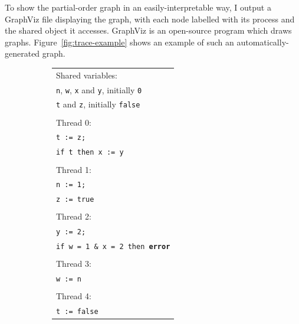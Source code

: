 \documentclass[12pt,a4paper,twoside,openany]{report}
\begin{document}
To show the partial-order graph in an
easily-interpretable way, I
output a GraphViz file displaying the
graph, with each node
labelled with its process and the
shared object it accesses.
GraphViz is an open-source program which
draws graphs.
Figure~\ref{fig:trace-example}
shows an example of such an
automatically-generated graph.

\begin{figure}
	\centering
	\begin{subfigure}{0.5\textwidth}
		\centering
		\begin{tabular}{l}
			Shared variables: \\
			\qquad \texttt{n}, \texttt{w},
			\texttt{x} and \texttt{y},
			initially \texttt{0} \\
			\qquad \texttt{t} and \texttt{z},
			initially \texttt{false} \\
			\\
			Thread 0: \\
			\qquad \texttt{t := z;} \\
			\qquad \texttt{if t then x := y} \\
			\\
			Thread 1: \\
			\qquad \texttt{n := 1;} \\
			\qquad \texttt{z := true} \\
			\\
			Thread 2: \\
			\qquad \texttt{y := 2;} \\
			\qquad \texttt{if w = 1 \& x = 2 then \textbf{error}} \\
			\\
			Thread 3: \\
			\qquad \texttt{w := n} \\
			\\
			Thread 4: \\
			\qquad \texttt{t := false} \\
		\end{tabular}
	\end{subfigure}%
	\begin{subfigure}{0.5\textwidth}
		\centering

\end{subfigure}
\end{figure}
\end{document}
